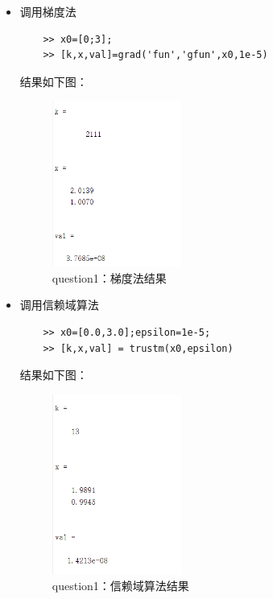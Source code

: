 \documentclass[12pt]{article} %
\begin{document}
	\begin{itemize}
		\item 调用梯度法
		\begin{lstlisting}
	>> x0=[0;3];
	>> [k,x,val]=grad('fun','gfun',x0,1e-5)
		\end{lstlisting}
	
		结果如下图：	
		\begin{figure}[ht]
		\centering
		\includegraphics[width=0.4\textwidth]{q1grad.png}
		\caption{question1：梯度法结果}
		\label{fig:fig1}
		\end{figure}
		
		\item 调用信赖域算法
		\begin{lstlisting}
	>> x0=[0.0,3.0];epsilon=1e-5;
	>> [k,x,val] = trustm(x0,epsilon)
		\end{lstlisting}
	
		结果如下图：
		\begin{figure}[ht]
			\centering
			\includegraphics[width=0.4\textwidth]{q1trustq.png}
			\caption{question1：信赖域算法结果}
			\label{fig:fig1}
		\end{figure}
	\end{itemize}
\end{document}

